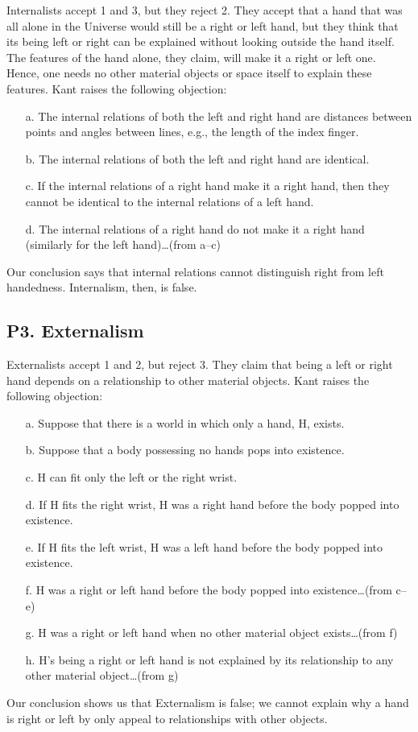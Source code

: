 \documentclass[oneside]{article}
\begin{document}
Internalists accept 1 and 3, but they reject 2. They accept that a hand
that was all alone in the Universe would still be a right or left hand,
but they think that its being left or right can be explained without
looking outside the hand itself. The features of the hand alone, they
claim, will make it a right or left one. Hence, one needs no other
material objects or space itself to explain these features. Kant raises the following objection:

\begin{enumerate}

\item[a.]
  The internal relations of both the left and right hand are distances
  between points and angles between lines, e.g., the length of the index
  finger.
\item[b.]
  The internal relations of both the left and right hand are identical.
\item[c.]
  If the internal relations of a right hand make it a right hand, then
  they cannot be identical to the internal relations of a left hand.
\item[d.]
  The internal relations of a right hand do not make it a right hand
  (similarly for the left hand)\ldots{}(from a--c)
\end{enumerate}
Our conclusion says that internal relations cannot distinguish right
from left handedness. Internalism, then, is false. 

\subsection*{P3. Externalism}\label{p3.-externalism}

Externalists accept 1 and 2, but reject 3. They claim that being a left
or right hand depends on a relationship to other material objects. Kant raises the following objection:

\begin{enumerate}

\item[a.] 
  Suppose that there is a world in which only a hand, H, exists.
\item[b.]
  Suppose that a body possessing no hands pops into existence.
\item[c.]
  H can fit only the left or the right wrist.
\item[d.]
  If H fits the right wrist, H was a right hand before the body popped
  into existence.
\item[e.]
  If H fits the left wrist, H was a left hand before the body popped
  into existence.
\item[f.]
  H was a right or left hand before the body popped into
  existence\ldots{}(from c--e)
\item[g.]
  H was a right or left hand when no other material object
  exists\ldots{}(from f)
\item[h.]
  H's being a right or left hand is not explained by its relationship to
  any other material object\ldots{}(from g)
\end{enumerate}
Our conclusion shows us that Externalism is false; we cannot explain why a hand is right or left by only appeal to relationships with other objects. 
\end{document}
